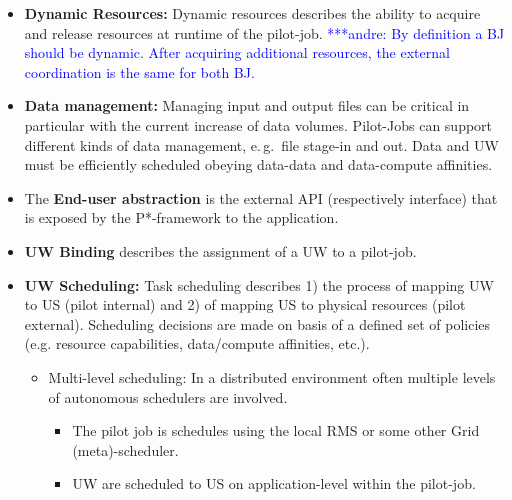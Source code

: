 \documentclass[conference,final]{IEEEtran}
\newcommand{\alnote}[1]{ {\textcolor{blue} { ***andre: #1 }}}
\newcommand{\alnote}[1]{}
\begin{document}
\begin{itemize}
	\item \textbf{Dynamic Resources:} Dynamic resources describes the ability 
	to acquire and release resources at runtime of the pilot-job.
	    \alnote{By definition a BJ should be dynamic. After acquiring additional 
	    resources, the external coordination is the same for both BJ.}

	\item \textbf{Data management:} Managing input and output files can be 
	critical in particular with the current increase of data volumes. Pilot-Jobs 
	can support different kinds of data management, e.\,g.\ file stage-in and 
	out. Data and UW must be efficiently scheduled obeying data-data and 
	data-compute affinities. 

	\item The \textbf{End-user abstraction} is the external API (respectively 
	interface) that is exposed by the P*-framework to the application.
	\item \textbf{UW Binding} describes the assignment of a UW to a pilot-job.
	\item \textbf{UW Scheduling:} Task scheduling describes 1) the process of  
	mapping UW to US (pilot internal) and 2) of mapping US to physical 
	resources (pilot external). Scheduling decisions are made on basis of a 
	defined set of policies (e.g. resource capabilities, data/compute 
	affinities, etc.).
	\begin{itemize}
	 			\item Multi-level scheduling: In a distributed environment often multiple levels of autonomous schedulers are involved. 
	 			\begin{itemize}	 			  
	 			   \item The pilot job is schedules using the local RMS or some 
	 			   other Grid (meta)-scheduler.
	 			   \item UW are scheduled to US on application-level within the 
	 			   pilot-job.
	 			\end{itemize}
	\end{itemize}


\end{itemize}
\end{document}
